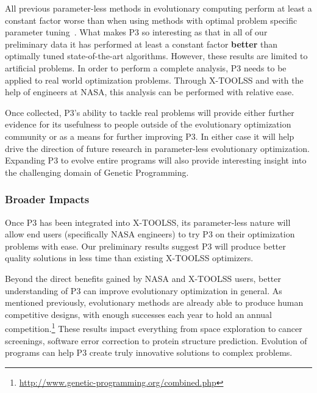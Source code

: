 \documentclass{article}
\begin{document}
All previous parameter-less methods in evolutionary computing perform at least a constant factor
worse than when using methods with optimal problem specific parameter tuning~\cite{pelikan:2004:parameterlesshboa}.
What makes P3 so interesting as that in all of our preliminary data it has performed at
least a constant factor \textbf{better} than optimally tuned state-of-the-art algorithms.
However, these results are limited to artificial problems.  In order to perform a complete analysis,
P3 needs to be applied to real world optimization problems.  Through X-TOOLSS and 
with the help of engineers at NASA, this
analysis can be performed with relative ease.

Once collected, P3's ability to tackle real problems will provide either further evidence for its usefulness
to people outside of the evolutionary optimization community or as a means for further improving P3.
In either case it will help drive the direction of future research in parameter-less evolutionary optimization.
Expanding P3 to evolve entire programs will also provide interesting insight into the challenging domain
of Genetic Programming.


\subsubsection*{Broader Impacts}
Once P3 has been integrated into X-TOOLSS, its parameter-less nature will allow
end users (specifically NASA engineers) to try P3 on their optimization problems with ease.
Our preliminary results suggest P3 will produce better quality solutions in less time
than existing X-TOOLSS optimizers.

Beyond the direct benefits gained by NASA and X-TOOLSS users, better understanding of P3
can improve evolutionary optimization in general.  As mentioned previously, evolutionary
methods are already able to produce human competitive designs, with enough successes each
year to hold an annual competition.\footnote{\url{http://www.genetic-programming.org/combined.php}}
These results impact everything from space exploration to cancer screenings, software error correction
to protein structure prediction.  Evolution of programs can help P3 create truly innovative solutions to complex problems.


\newpage


\end{document}
